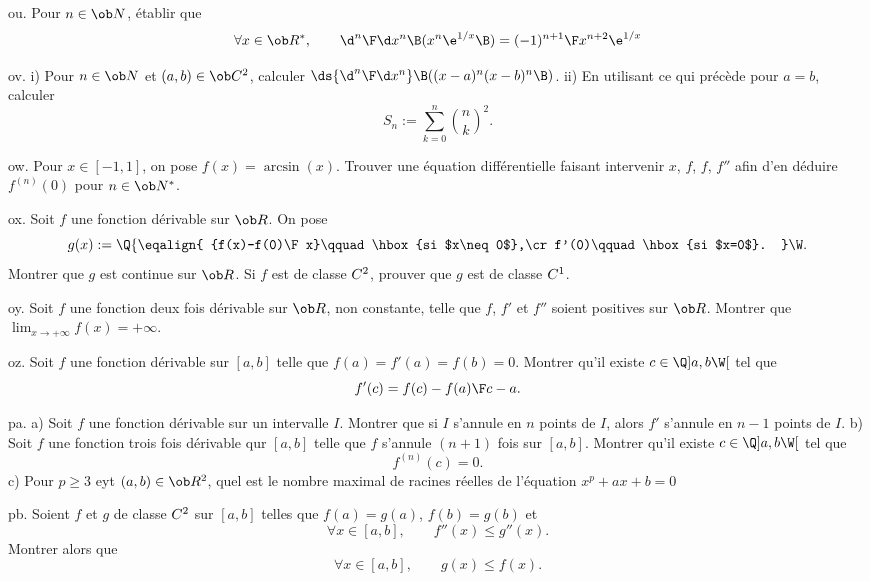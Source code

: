 \exo [Level=1,Fight=1,Learn=1,Field=\Dérivation,Type=\Exercices,Origin=] ou. 
Pour $n\in\ob N$, établir que 
$$
\forall x\in\ob R^*, \qquad {\d^n\F\d x^n}\B(x^n\e^{1/x}\B)={(-1)^{n+1}\F x^{n+2}}\e^{1/x}
$$

\exo [Level=1,Fight=1,Learn=1,Field=\Dérivation,Type=\Exercices,Origin=] ov. 
i) Pour $n\in\ob N$ et $(a,b)\in\ob C^2$, calculer $\ds {\d^n\F\d x^n}\B((x-a)^n(x-b)^n\B)$. \pn 
ii) En utilisant ce qui précède pour $a=b$, calculer 
$$ 
S_n:=\sum_{k=0}^n{n\choose k}^2.
$$ 

\exo [Level=1,Fight=1,Learn=1,Field=\Fonctions,Type=\Exercices,Origin=] ow. Pour $x\in[-1,1]$, on pose $f(x)=\arcsin(x)$. Trouver une équation différentielle  faisant intervenir $x$, $f$, $f$, $f''$ afin d'en déduire $f^{(n)}(0)$ pour $n\in\ob N^*$. 

\exo [Level=1,Fight=1,Learn=1,Field=\Dérivation,Type=\Exercices,Origin=] ox. 
Soit $f$ une fonction dérivable sur $\ob R$. On pose 
$$
g(x):=\Q\{
\eqalign{
{f(x)-f(0)\F x}\qquad\hbox{si $x\neq 0$},\cr
f'(0)\qquad\hbox{si $x=0$}.
}
\W.
$$
Montrer que $g$ est continue sur $\ob R$. Si $f$ est de classe $\sc C^2$, prouver que $g$ est de classe $\sc C^1$. 

\exo [Level=1,Fight=1,Learn=1,Field=\Intégration,Type=\Exercices,Origin=] oy. 
Soit $f$ une fonction deux fois dérivable sur $\ob R$, non constante, telle que $f$, $f'$ et $f''$ soient positives sur $\ob R$. Montrer que $\lim_{x\to+\infty}f(x)=+\infty$. 

\exo [Level=1,Fight=1,Learn=1,Field=\ThéorèmeDeRolle,Type=\Exercices,Origin=,Indication=
{On pourra utiliser la fonction $g$ définie par $\ds g(x)={f(x)-f(a)\F x-a}$.}] oz. 
Soit $f$ une fonction dérivable sur $[a,b]$ telle que $f(a)=f'(a)=f(b)=0$. Montrer qu'il existe $c\in\Q]a,b\W[$ tel que 
$$
f'(c)={f(c)-f(a)\F c-a}.
$$

\exo [Level=1,Fight=3,Learn=3,Field=\ThéorèmeDeRolle,Type=\Exercices,Origin=] pa. 
a) Soit $f$ une fonction dérivable sur un intervalle $I$. \pn Montrer que si $I$ s'annule en $n$ points de $I$, alors $f'$ s'annule en $n-1$ points de $I$. \pn
b) Soit $f$ une fonction trois fois dérivable qur $[a,b]$ telle que $f$ s'annule $(n+1)$ fois sur $[a,b]$. \pn 
Montrer qu'il existe $c\in\Q]a,b\W[$ tel que $$
f^{(n)}(c)=0.
$$ 
c) Pour $p\ge 3$ eyt $(a,b)\in\ob R^2$, quel est le nombre maximal de racines réelles de l'équation $x^p+ax+b=0$


\exo [Level=1,Fight=2,Learn=2,Field=\ThéorèmeDeRolle,Type=\Exercices,Origin=] pb. 
Soient $f$ et $g$ de classe $\sc C^2$ sur $[a,b]$ telles que $f(a)=g(a)$, $f(b)=g(b)$ et 
$$
\forall x\in[a,b],\qquad f''(x)\le g''(x). 
$$
Montrer alors que 
$$
\forall x\in[a,b], \qquad g(x)\le f(x).
$$ 

